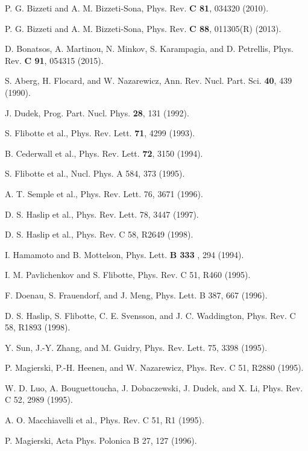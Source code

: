 \documentclass[twocolumn,prc,showpacs,preprintnumbers,superscriptaddress,floatfix]{revtex4}
\begin{document}
\begin{thebibliography}{99}
 P. G. Bizzeti and A. M. Bizzeti-Sona, Phys. Rev. \textbf{%
C 81}, 034320 (2010).

 P. G. Bizzeti and A. M. Bizzeti-Sona, Phys. Rev. \textbf{%
C 88}, 011305(R) (2013).

 D. Bonatsos, A. Martinou, N. Minkov, S. Karampagia, and
D. Petrellis, Phys. Rev. \textbf{C 91}, 054315 (2015).

 S. Aberg, H. Flocard, and W. Nazarewicz, Ann. Rev. Nucl.
Part. Sci. \textbf{40}, 439 (1990).

 J. Dudek, Prog. Part. Nucl. Phys. \textbf{28}, 131 (1992).

 S. Flibotte et al., Phys. Rev. Lett. \textbf{71}, 4299
(1993).

 B. Cederwall et al., Phys. Rev. Lett. \textbf{72},
3150 (1994).

 S. Flibotte et al., Nucl. Phys. A 584, 373 (1995).

 A. T. Semple et al., Phys. Rev. Lett. 76, 3671 (1996).

 D. S. Haslip et al., Phys. Rev. Lett. 78, 3447 (1997).

 D. S. Haslip et al., Phys. Rev. C 58, R2649 (1998).

 I. Hamamoto and B. Mottelson, Phys. Lett. \textbf{B 333}%
, 294 (1994).

 I. M. Pavlichenkov and S. Flibotte, Phys. Rev. C
51, R460 (1995).

 F. Doenau, S. Frauendorf, and J. Meng, Phys. Lett. B 387,
667 (1996).

 D. S. Haslip, S. Flibotte, C. E. Svensson, and J. C.
Waddington, Phys. Rev. C 58, R1893 (1998).

 Y. Sun, J.-Y. Zhang, and M. Guidry, Phys. Rev. Lett. 75,
3398 (1995).

 P. Magierski, P.-H. Heenen, and W. Nazarewicz, Phys. Rev.
C 51, R2880 (1995).

 W. D. Luo, A. Bouguettoucha, J. Dobaczewski, J. Dudek, and
X. Li, Phys. Rev. C 52, 2989 (1995).

 A. O. Macchiavelli et al., Phys. Rev. C 51, R1
(1995).

 P. Magierski, Acta Phys. Polonica B 27, 127 (1996).


\end{thebibliography}
\end{document}
